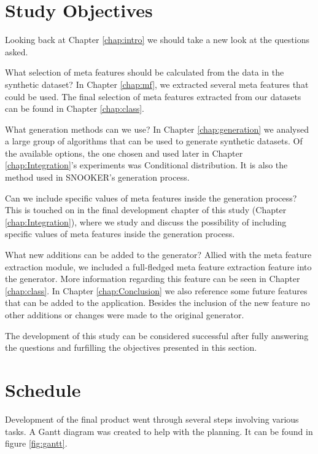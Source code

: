 \section{Study Objectives}
Looking back at Chapter \ref{chap:intro} we should take a new look at the questions asked.

What selection of meta features should be calculated from the data in the synthetic dataset? In Chapter \ref{chap:mf}, we extracted several meta features that could be used. The final selection of meta features extracted from our datasets can be found in Chapter \ref{chap:class}.

What generation methods can we use? In Chapter \ref{chap:generation} we analysed a large group of algorithms that can be used to generate synthetic datasets. Of the available options, the one chosen and used later in Chapter \ref{chap:Integration}'s experiments was Conditional distribution. It is also the method used in SNOOKER's generation process.

Can we include specific values of meta features inside the generation process? This is touched on in the final development chapter of this study (Chapter \ref{chap:Integration}), where we study and discuss the possibility of including specific values of meta features inside the generation process.

What new additions can be added to the generator? Allied with the meta feature extraction module, we included a full-fledged meta feature extraction feature into the generator. More information regarding this feature can be seen in Chapter \ref{chap:class}. In Chapter \ref{chap:Conclusion} we also reference some future features that can be added to the application. Besides the inclusion of the new feature no other additions or changes were made to the original generator. 

The development of this study can be considered successful after fully answering the questions and furfilling the objectives presented in this section.


\section{Schedule}
Development of the final product went through several steps involving various tasks. A Gantt diagram was created to help with the planning. It can be found in figure \ref{fig:gantt}. 

